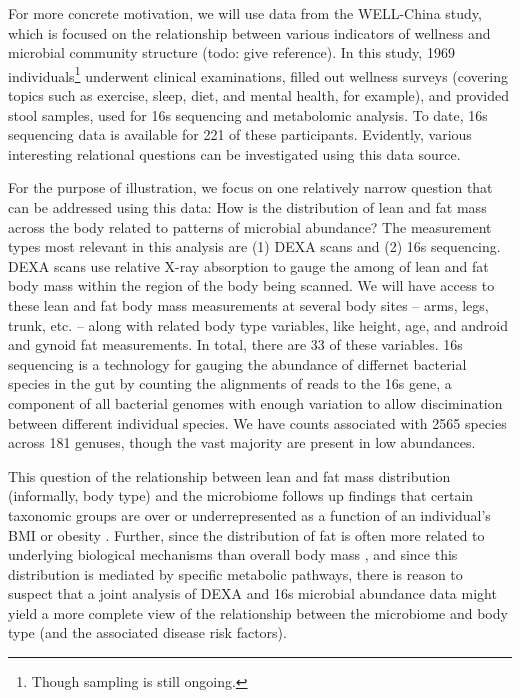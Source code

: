 \documentclass{article}
\begin{document}
For more concrete motivation, we will use data from the WELL-China study, which
is focused on the relationship between various indicators of wellness and
microbial community structure (todo: give reference). In this study, 1969
individuals\footnote{Though sampling is still ongoing.} underwent clinical
examinations, filled out wellness surveys (covering topics such as exercise,
sleep, diet, and mental health, for example), and provided stool samples, used
for 16s sequencing and metabolomic analysis. To date, 16s sequencing data is
available for 221 of these participants. Evidently, various interesting
relational questions can be investigated using this data source.

For the purpose of illustration, we focus on one relatively narrow question that
can be addressed using this data: How is the distribution of lean and fat mass
across the body related to patterns of microbial abundance? The measurement
types most relevant in this analysis are (1) DEXA scans and (2) 16s sequencing.
DEXA scans use relative X-ray absorption to gauge the among of lean and fat body
mass within the region of the body being scanned. We will have access to these
lean and fat body mass measurements at several body sites -- arms, legs, trunk,
etc. -- along with related body type variables, like height, age, and android
and gynoid fat measurements. In total, there are 33 of these variables. 16s
sequencing is a technology for gauging the abundance of differnet bacterial
species in the gut by counting the alignments of reads to the 16s gene, a
component of all bacterial genomes with enough variation to allow discimination
between different individual species. We have counts associated with 2565
species across 181 genuses, though the vast majority are present in low
abundances.

This question of the relationship between lean and fat mass distribution
(informally, body type) and the microbiome follows up findings that certain
taxonomic groups are over or underrepresented as a function of an individual's
BMI or obesity \citep{ley2006microbial, turnbaugh2009core, ley2005obesity,
  ley2010obesity}. Further, since the distribution of fat is often more related
to underlying biological mechanisms than overall body mass
\citep{matsuzawa2008role}, and since this distribution is mediated by specific
metabolic pathways, there is reason to suspect that a joint analysis of DEXA and
16s microbial abundance data might yield a more complete view of the
relationship between the microbiome and body type (and the associated disease
risk factors).
\end{document}
